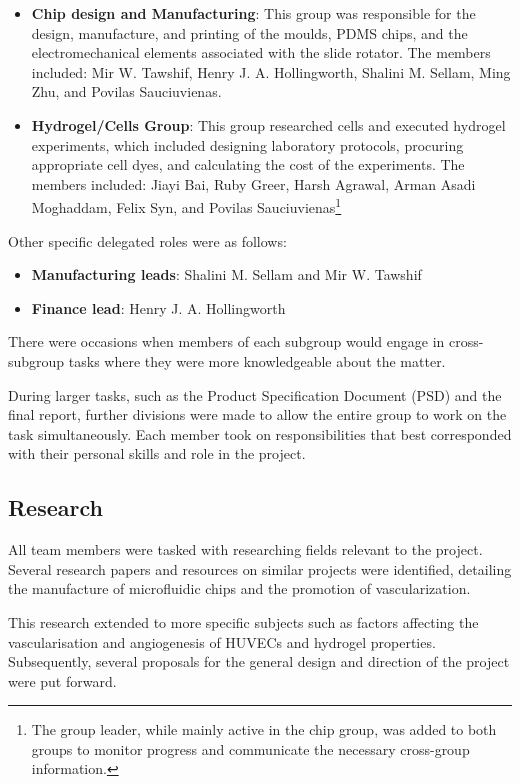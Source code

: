 \documentclass[letterpaper,12pt]{article}
\begin{document}
\begin{itemize}
    \item \textbf{Chip design and Manufacturing}: This group was responsible for the design, manufacture, and printing of the moulds, PDMS chips, and the electromechanical elements associated with the slide rotator. The members included: Mir W. Tawshif, Henry J. A. Hollingworth, Shalini M. Sellam, Ming Zhu, and Povilas Sauciuvienas.
    \item \textbf{Hydrogel/Cells Group}: This group researched cells and executed hydrogel experiments, which included designing laboratory protocols, procuring appropriate cell dyes, and calculating the cost of the experiments. The members included: Jiayi Bai, Ruby Greer, Harsh Agrawal, Arman Asadi Moghaddam, Felix Syn, and Povilas Sauciuvienas\footnote{The group leader, while mainly active in the chip group, was added to both groups to monitor progress and communicate the necessary cross-group information.} 
\end{itemize}

Other specific delegated roles were as follows:
\begin{itemize}
    \item \textbf{Manufacturing leads}: Shalini M. Sellam and Mir W. Tawshif 
    \item \textbf{Finance lead}: Henry J. A. Hollingworth  
\end{itemize}

There were occasions when members of each subgroup would engage in cross-subgroup tasks where they were more knowledgeable about the matter.

During larger tasks, such as the Product Specification Document (PSD) and the final report, further divisions were made to allow the entire group to work on the task simultaneously. Each member took on responsibilities that best corresponded with their personal skills and role in the project.

\subsection{Research}
All team members were tasked with researching fields relevant to the project. Several research papers and resources on similar projects were identified, detailing the manufacture of microfluidic chips and the promotion of vascularization.

This research extended to more specific subjects such as factors affecting the vascularisation and angiogenesis of HUVECs and hydrogel properties. Subsequently, several proposals for the general design and direction of the project were put forward.  
\end{document}
